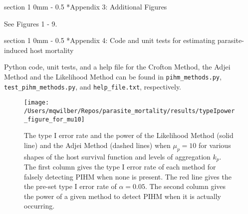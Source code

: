 \documentclass[12pt, a4paper]{article}
\makeatletter
\renewcommand{\section}{\@startsection
{section}%
{1}%
{0mm}%
{-\baselineskip}%
{0.5\baselineskip}%
{\normalfont\bf\large}} %
\makeatother
\begin{document}


\section*{Appendix 3: Additional Figures}

See Figures 1 - 9.

\section*{Appendix 4: Code and unit tests for estimating parasite-induced host mortality}

Python code, unit tests, and a help file for the Crofton Method, the Adjei Method and the Likelihood Method can be found in \verb*#pihm_methods.py#, \verb*#test_pihm_methods.py#, and \verb*#help_file.txt#, respectively.


\begin{figure}

    \texttt{[image: /Users/mqwilber/Repos/parasite\_mortality/results/typeIpower\_figure\_for\_mu10]}

    \caption{The type I error rate and the power of the Likelihood Method (solid line) and the Adjei Method (dashed lines) when $\mu_p = 10$ for various shapes of the host survival function and levels of aggregation $k_p$.  The first column gives the type I error rate of each method for falsely detecting PIHM when none is present.  The red line gives the the pre-set type I error rate of $\alpha = 0.05$.  The second column gives the power of a given method to detect PIHM when it is actually occurring. }
    \label{fig:typeI10}

\end{figure}
\end{document}
